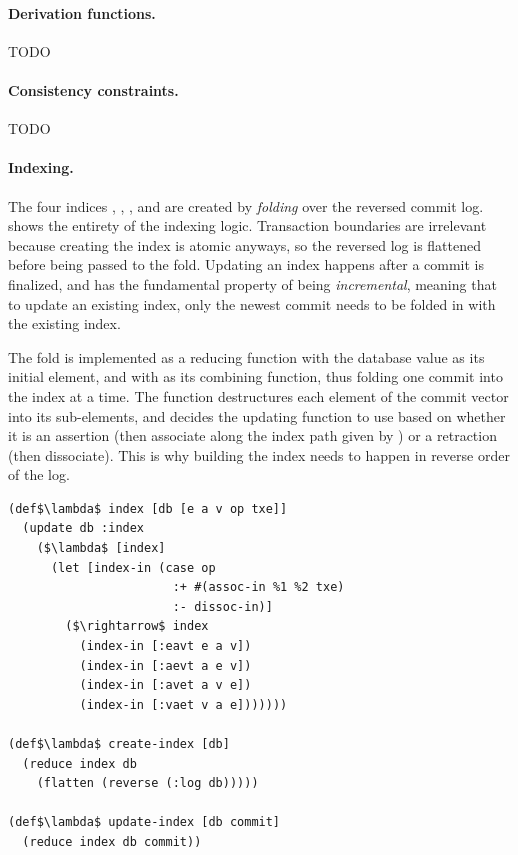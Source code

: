 \paragraph{Derivation functions.}

TODO

\paragraph{Consistency constraints.}

TODO


\paragraph{Indexing.} The four indices , , , and  are created by \emph{folding} over the reversed commit log.  shows the entirety of the indexing logic. Transaction boundaries are irrelevant because creating the index is atomic anyways, so the reversed log is flattened before being passed to the fold. Updating an index happens after a commit is finalized, and has the fundamental property of being \emph{incremental}, meaning that to update an existing index, only the newest commit needs to be folded in with the existing index.

The fold is implemented as a reducing function with the database value as its initial element, and with  as its combining function, thus folding one commit into the index at a time. The  function destructures each element of the commit vector into its sub-elements, and decides the updating function to use based on whether it is an assertion (then associate  along the index path given by ) or a retraction (then dissociate). This is why building the index needs to happen in reverse order of the log.

\begin{lstlisting}[label={lst:index_code},morekeywords={:eavt,:avet,:aevt,:vaet,flatten,def,assoc-in,dissoc-in},caption=Updating the index]
(def$\lambda$ index [db [e a v op txe]]
  (update db :index
    ($\lambda$ [index]
      (let [index-in (case op
                       :+ #(assoc-in %1 %2 txe)
                       :- dissoc-in)]
        ($\rightarrow$ index
          (index-in [:eavt e a v])
          (index-in [:aevt a e v])
          (index-in [:avet a v e])
          (index-in [:vaet v a e]))))))

(def$\lambda$ create-index [db]
  (reduce index db
    (flatten (reverse (:log db)))))

(def$\lambda$ update-index [db commit]
  (reduce index db commit))
\end{lstlisting}

